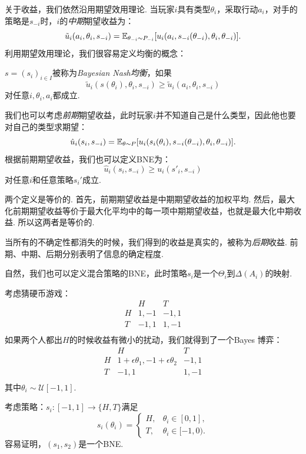 关于收益，我们依然沿用期望效用理论. 当玩家$i$具有类型$\theta_i$，采取行动$a_i$，对手的策略是$s_{-i}$时，$i$的\emph{中期}期望收益为：
    \[\tilde u_i(a_i,\theta_i,s_{-i})=\mathbb{E}_{\theta_{-i}\sim P_{-i}}[u_i(a_i,s_{-i}(\theta_{-i}),\theta_i,\theta_{-i})].\]
利用期望效用理论，我们很容易定义均衡的概念：
\begin{definition}
$s=(s_i)_{i\in I}$被称为\emph{Bayesian Nash均衡}，如果
    \[\tilde u_i(s(\theta_i),\theta_i,s_{-i})\geq \tilde u_i(a_i,\theta_i,s_{-i})\]
对任意$i,\theta_i,a_i$都成立.
\end{definition}

我们也可以考虑\emph{前期}期望收益，此时玩家$i$并不知道自己是什么类型，因此他也要对自己的类型求期望：
     \[\hat u_i(s_i,s_{-i})=\mathbb{E}_{\theta\sim P}[u_i(s_i(\theta_i),s_{-i}(\theta_{-i}),\theta_i,\theta_{-i})].\]
根据前期期望收益，我们也可以定义BNE为：
     \[\hat u_i(s_i,s_{-i})\geq u_i(s'_i,s_{-i})\]
对任意$i$和任意策略$s_i'$成立.

两个定义是等价的. 首先，前期期望收益是中期期望收益的加权平均. 然后，最大化前期期望收益等价于最大化平均中的每一项中期期望收益，也就是最大化中期收益. 所以这两者是等价的.

当所有的不确定性都消失的时候，我们得到的收益是真实的，被称为\emph{后期}收益. 前期、中期、后期分别表明了信息的确定程度.

\begin{remark}
    自然，我们也可以定义混合策略的BNE，此时策略$s_i$是一个$\Theta_i$到$\Delta(A_i)$的映射.
\end{remark}


\begin{example}[猜硬币游戏的BNE]
考虑猜硬币游戏：
\[
\begin{array}{c|cc}
    &H&T  \\\hline
    H&1,-1 &-1,1\\
    T&-1,1&1,-1\\
\end{array}
\]
如果两个人都出$H$的时候收益有微小的扰动，我们就得到了一个Bayes 博弈：
\[
\begin{array}{c|cc}
    &H&T  \\\hline
    H&1+\epsilon\theta_1,-1+\epsilon\theta_2 &-1,1\\
    T&-1,1&1,-1\\
\end{array}
\]
其中$\theta_i\sim\mathcal U[-1,1]$.

考虑策略：$s_i:[-1,1]\to\{H,T\}$满足
\[s_i(\theta_i)=\begin{cases}
H,&\theta_i\in[0,1],\\
T,&\theta_i\in[-1,0).
\end{cases}\]
容易证明，$(s_1,s_2)$是一个BNE. 
\end{example}

